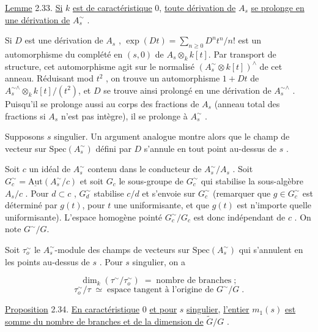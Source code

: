 
\underline{Lemme} 2.33. \underline{Si} $k$ \underline{est de caractéristique} $0$, \underline{toute dérivation de} $A_s$ \underline{se prolonge en une dérivation de} $A_s^{\sim}$ .

Si $D$ est une dérivation de $A_s$ , $\exp(Dt) = \sum_{n\geq0} D^n t^n/n!$ est un automorphisme du complété en $(s,0)$ de $A_s \otimes_k k[t]$. Par transport de structure, cet automorphisme agit sur le normalisé $(A_s^{\sim} \otimes k[t])^{\wedge}$ de cet anneau. Réduisant mod $t^2$ , on trouve un automorphisme $1 + Dt$ de $A_s^{\sim\wedge} \otimes_k k[t]/(t^2)$, et $D$ se trouve ainsi prolongé en une dérivation de $A_s^{\sim\wedge}$ . Puisqu'il se prolonge aussi au corps des fractions de $A_s$ (anneau total des fractions si $A_s$ n'est pas intègre), il se prolonge à $A_s^{\sim}$ .

Supposons $s$ singulier. Un argument analogue montre alors que le champ de vecteur sur $\mathrm{Spec}(A_s^{\sim})$ défini par $D$ s'annule en tout point au-dessus de $s$ .

Soit $c$ un idéal de $A_s^{\sim}$ contenu dans le conducteur de $A_s^{\sim}/A_s$ . Soit $G_c^{\sim} = \underline{\mathrm{Aut}}(A_s^{\sim}/c)$ et soit $G_c$ le sous-groupe de $G_c^{\sim}$ qui stabilise la sous-algèbre $A_s/c$ . Pour $d \subset c$ , $G_d^{\sim}$ stabilise $c/d$ et s'envoie sur $G_c^{\sim}$ (remarquer que $g \in G_c^{\sim}$ est déterminé par $g(t)$, pour $t$ une uniformisante, et que $g(t)$ est n'importe quelle uniformisante). L'espace homogène pointé $G_c^{\sim}/G_c$ est donc indépendant de $c$ . On note $G^{\sim}/G$.

Soit $\tau_o^{\sim}$ le $A_s^{\sim}$-module des champs de vecteurs sur $\mathrm{Spec}(A_s^{\sim})$ qui s'annulent en les points au-dessus de $s$ . Pour $s$ singulier, on a

\begin{equation*}
\dim_k(\tau^{\sim}/\tau_o^{\sim}) \;=\; \mbox{nombre de branches} \;;
\end{equation*}
\begin{equation*}
\tau_o^{\sim}/\tau \;\simeq\; \mbox{espace tangent à l'origine de } G^{\sim}/G \;.
\end{equation*}


\underline{Proposition} 2.34. \underline{En caractéristique} $0$ \underline{et pour} $s$ \underline{singulier}, \underline{l'entier} $m_1(s)$ \underline{est somme du nombre de branches et de la dimension de} $\widetilde{G}/G$ .


